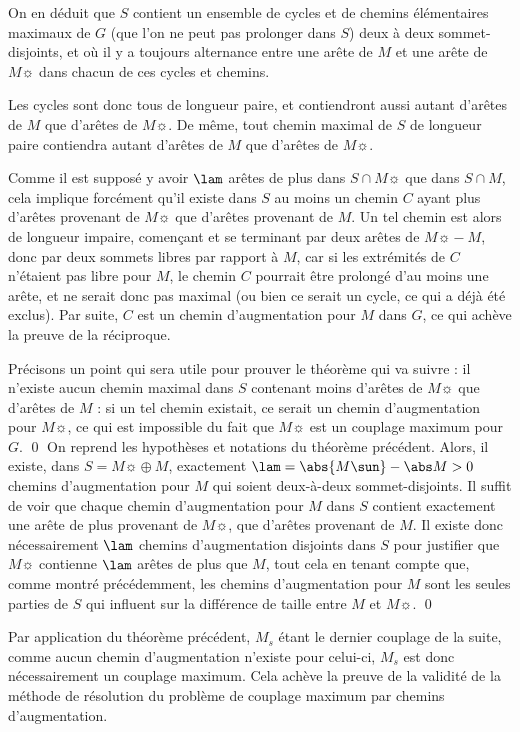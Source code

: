     On en déduit que $S$ contient un ensemble de cycles et de chemins élémentaires maximaux de $G$ (que l'on ne peut pas prolonger dans $S$) deux à deux sommet-disjoints, et où il y a toujours alternance entre une arête de $M$ et une arête de $M\sun$ dans chacun de ces cycles et chemins.
    
    Les cycles sont donc tous de longueur paire, et contiendront aussi autant d'arêtes de $M$ que d'arêtes de $M\sun$. De même, tout chemin maximal de $S$ de longueur paire contiendra autant d'arêtes de $M$ que d'arêtes de $M\sun$.
    
    Comme il est supposé y avoir $\lam$ arêtes de plus dans $S \cap M\sun$ que dans $S \cap M$, cela implique forcément qu'il existe dans $S$ au moins un chemin $C$ ayant plus d'arêtes provenant de $M\sun$ que d'arêtes provenant de $M$. Un tel chemin est alors de longueur impaire, començant et se terminant par deux arêtes de $M\sun \minus M$, donc par deux sommets libres par rapport à $M$, car si les extrémités de $C$ n'étaient pas libre pour $M$, le chemin $C$ pourrait être prolongé d'au moins une arête, et ne serait donc pas maximal (ou bien ce serait un cycle, ce qui a déjà été exclus). Par suite, $C$ est un chemin d'augmentation pour $M$ dans $G$, ce qui achève la preuve de la réciproque.
    
    Précisons un point qui sera utile pour prouver le théorème qui va suivre : il n'existe aucun chemin maximal dans $S$ contenant moins d'arêtes de $M\sun$ que d'arêtes de $M$ : si un tel chemin existait, ce serait un chemin d'augmentation pour $M\sun$, ce qui est impossible du fait que $M\sun$ est un couplage maximum pour $G$.
 \qed\SEP
  On reprend les hypothèses et notations du théorème précédent. Alors, il existe, dans $S = M\sun \oplus M$, exactement $\lam = \abs {M\sun} - \abs M > 0$ chemins d'augmentation pour $M$ qui soient deux-à-deux sommet-disjoints.
 \SEP\jpreuve
    Il suffit de voir que chaque chemin d'augmentation pour $M$ dans $S$ contient exactement une arête de plus provenant de $M\sun$, que d'arêtes provenant de $M$. Il existe donc nécessairement $\lam$ chemins d'augmentation disjoints dans $S$ pour justifier que $M\sun$ contienne $\lam$ arêtes de plus que $M$, tout cela en tenant compte que, comme montré précédemment, les chemins d'augmentation pour $M$ sont les seules parties de $S$ qui influent sur la différence de taille entre $M$ et $M\sun$.
 \qed \SEP
 
 Par application du théorème précédent, $M_s$ étant le dernier couplage de la suite, comme aucun chemin d'augmentation n'existe pour celui-ci, $M_s$ est donc nécessairement un couplage maximum. Cela achève la preuve de la validité de la méthode de résolution du problème de couplage maximum par chemins d'augmentation.
 
